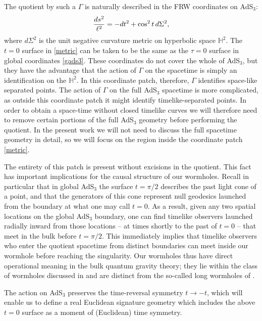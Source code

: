 \documentclass[12pt]{article}
\newcommand{\HH}{\mathbb{H}}
\newcommand{\be}{\begin{equation}}
\newcommand{\ee}{\end{equation}}
\numberwithin{equation}{section}
\begin{document}
The quotient by such a $\Gamma$ is naturally described in
the FRW coordinates on AdS$_3$:
%
\be\label{metric}
{ds^2 \over \ell^2} = -dt^2 + \cos^2 t \, d\Sigma^2,
\ee
%
where $d\Sigma^2$ is the unit negative curvature metric on hyperbolic space $\HH^2$.  The $t=0$ surface in \eqref{metric} can be taken to be the same as the $\tau=0$ surface in global coordinates \eqref{gads3}.  These coordinates do not cover the whole of AdS$_3$, but they have the advantage that the action of $\Gamma$ on the spacetime is simply an identification on the $\HH^2$.  In this coordinate patch, therefore, $\Gamma$ identifies space-like separated points.  The action of $\Gamma$ on the full AdS$_3$ spacetime is more complicated, as outside this coordinate patch it might identify timelike-separated points.  In order to obtain a space-time without closed timelike curves we will therefore need to remove certain portions of the full AdS$_3$ geometry before performing the quotient.
In the present work we will not need to discuss the full spacetime geometry in detail, so we will focus on the region inside the coordinate patch \eqref{metric}.

The entirety of this patch is present without excisions in the quotient. This fact has important implications for the causal structure of our wormholes.  Recall in particular that in global AdS${}_3$ the surface $t=\pi/2$ describes the past light cone of a point, and that the generators of this cone represent null geodesics launched from the boundary at what one may call $t=0$.  As a result, given any two spatial locations on the global AdS${}_3$ boundary, one can find timelike observers launched radially inward from those locations -- at times shortly to the past of $t=0$ -- that meet in the bulk before $t=\pi/2$.  This immediately implies that timelike observers who enter the quotient spacetime from distinct boundaries can meet inside our wormhole before reaching the singularity.  Our wormholes thus have direct operational meaning in the bulk quantum gravity theory; they lie within the class of wormholes discussed in \cite{Marolf:2012xe} and are distinct from the so-called long wormholes of \cite{Shenker:2013pqa,Shenker:2013yza}.

The action on AdS$_3$ preserves the time-reversal symmetry $t \to -t$, which will enable us to define a real Euclidean signature geometry which includes the above $t=0$ surface as a moment of (Euclidean) time symmetry.
\end{document}
